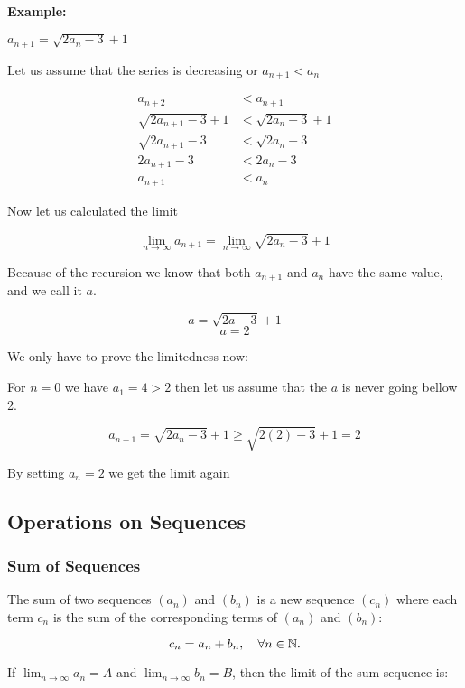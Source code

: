 \textbf{Example:} 

\(a_{n + 1} = \sqrt{2a_n - 3} + 1\)

Let us assume that the series is decreasing or \(a_{n + 1} < a_{n}\)

\begin{align*}
    a_{n + 2} &< a_{n + 1} \\
    \sqrt{2a_{n + 1} -3} + 1 &< \sqrt{2a_{n} - 3} + 1 \\
    \sqrt{2a_{n + 1} -3} &< \sqrt{2a_{n} - 3} \\
    2a_{n + 1} - 3 &< 2a_{n} - 3 \\
    a_{n + 1} &< a_{n}
\end{align*}

\QED

Now let us calculated the limit

\[
    \lim_{n \rightarrow \infty} a_{n + 1} = \lim_{n \rightarrow \infty} \sqrt{2a_n - 3} + 1
\]

Because of the recursion we know that both \(a_{n + 1}\) and \(a_n\) have the same value, 
and we call it \(a\).

\[
    a = \sqrt{2a -3} +1
\]
\[
    a = 2
\]

We only have to prove the limitedness now:

For \(n = 0\) we have \(a_1 = 4 > 2\) then let us assume that the \(a\) is never going bellow 2.

\[
    a_{n + 1} = \sqrt{2a_n - 3} + 1 \ge \sqrt{2(2) - 3} + 1 = 2
\]

By setting \(a_n = 2\) we get the limit again

\QED

\subsection{Operations on Sequences}

\subsubsection{Sum of Sequences}

The sum of two sequences \((a_n)\) and \((b_n)\) is a new sequence \((c_n)\) where each term 
\(c_n\) is the sum of the corresponding terms of \((a_n)\) and \((b_n)\):

\[
    c_n = a_n + b_n, \quad \forall n \in \mathbb{N}.
\]

If \(\lim_{n \to \infty} a_n = A\) and \(\lim_{n \to \infty} b_n = B\), then the limit of the sum sequence is:

